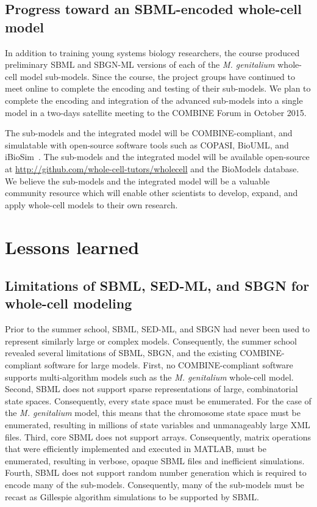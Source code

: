 \documentclass[journal,transmag]{IEEEtran}
\begin{document}
\subsection{Progress toward an SBML-encoded whole-cell model}
In addition to training young systems biology researchers, the course produced preliminary SBML and SBGN-ML versions of each of the \textit{M. genitalium} whole-cell model sub-models.
Since the course, the project groups have continued to meet online to complete the encoding and testing of their sub-models.
We plan to complete the encoding and integration of the advanced sub-models into a single model in a two-days satellite meeting to the COMBINE Forum in October 2015. 

The sub-models and the integrated model will be COMBINE-compliant, and simulatable with open-source software tools such as COPASI, BioUML, and iBioSim~\cite{Stevens2013}.
The sub-models and the integrated model will be available open-source at \url{http://github.com/whole-cell-tutors/wholecell} and the BioModels database.
We believe the sub-models and the integrated model will be a valuable community resource which will enable other scientists to develop, expand, and apply whole-cell models to their own research.

\section{Lessons learned}

\subsection{Limitations of SBML, SED-ML, and SBGN for whole-cell modeling}
Prior to the summer school, SBML, SED-ML, and SBGN had never been used to represent similarly large or complex models. 
Consequently, the summer school revealed several limitations of SBML, SBGN, and the existing COMBINE-compliant software for large models.
First, no COMBINE-compliant software supports multi-algorithm models such as the \textit{M. genitalium} whole-cell model. 
Second, SBML does not support sparse representations of large, combinatorial state spaces. Consequently, every state space must be enumerated. For the case of the \textit{M. genitalium} model, this means that the chromosome state space must be enumerated, resulting in millions of state variables and unmanageably large XML files.
Third, core SBML does not support arrays. Consequently, matrix operations that were efficiently implemented and executed in MATLAB, must be enumerated, resulting in verbose, opaque SBML files and inefficient simulations.
Fourth, SBML does not support random number generation which is required to encode many of the sub-models. Consequently, many of the sub-models must be recast as Gillespie algorithm simulations to be supported by SBML.
\end{document}
